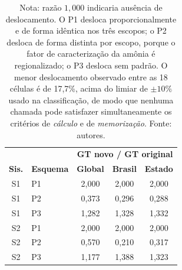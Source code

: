 \begin{table}[h]
\centering
\small
\caption{Efeito de cada esquema de perturba\c{c}\~ao sobre o \emph{ground truth}: raz\~ao entre o GT recalculado a partir do invent\'ario perturbado e o GT original publicado, por sistema e escopo geogr\'afico.}
\label{tab:sm_stress_gt_ratio}
\begin{tabular}{clccc}
\toprule
& & \multicolumn{3}{c}{\textbf{GT novo / GT original}} \\
\cmidrule(lr){3-5}
\textbf{Sis.} & \textbf{Esquema} & \textbf{Global} & \textbf{Brasil} & \textbf{Estado} \\
\midrule
S1 & P1 & 2,000 & 2,000 & 2,000 \\
S1 & P2 & 0,373 & 0,296 & 0,288 \\
S1 & P3 & 1,282 & 1,328 & 1,332 \\
\midrule
S2 & P1 & 2,000 & 2,000 & 2,000 \\
S2 & P2 & 0,570 & 0,210 & 0,317 \\
S2 & P3 & 1,177 & 1,388 & 1,323 \\
\bottomrule
\end{tabular}
\caption*{\footnotesize Nota: raz\~ao $1{,}000$ indicaria aus\^encia de deslocamento. O P1 desloca proporcionalmente e de forma id\^entica nos tr\^es escopos; o P2 desloca de forma distinta por escopo, porque o fator de caracteriza\c{c}\~ao da am\^onia \'e regionalizado; o P3 desloca sem padr\~ao. O menor deslocamento observado entre as 18 c\'elulas \'e de 17,7\%, acima do limiar de $\pm 10\%$ usado na classifica\c{c}\~ao, de modo que nenhuma chamada pode satisfazer simultaneamente os crit\'erios de \emph{c\'alculo} e de \emph{memoriza\c{c}\~ao}. Fonte: autores.}
\end{table}
